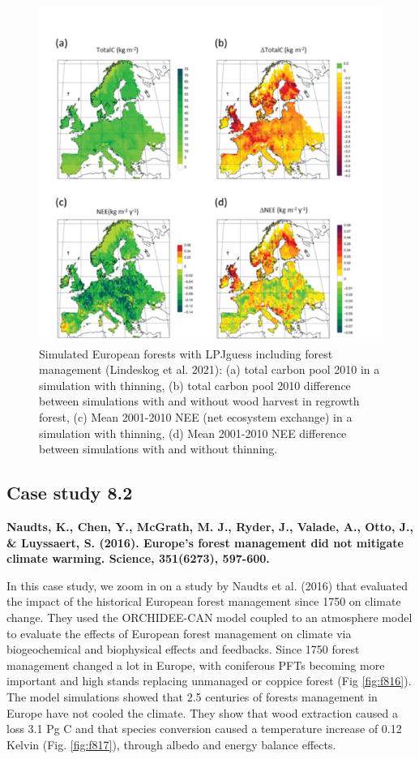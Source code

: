 \documentclass[12pt,oneside]{book}
\begin{document}
\begin{figure}

{\centering \includegraphics[width=0.8\linewidth]{figures/chap8/f815_LPJ_manag_result} 

}

\caption{Simulated European forests with LPJguess including forest management (Lindeskog et al. 2021): (a) total carbon pool 2010 in a simulation with thinning, (b) total carbon pool 2010 difference between simulations with and without wood harvest in regrowth forest, (c) Mean 2001-2010 NEE (net ecosystem exchange) in a simulation with thinning, (d) Mean 2001-2010 NEE difference between simulations with and without thinning.}\label{fig:f815}
\end{figure}

\subsection{Case study 8.2}\label{case-study-8.2}

\textbf{Naudts, K., Chen, Y., McGrath, M. J., Ryder, J., Valade, A.,
Otto, J., \& Luyssaert, S. (2016). Europe's forest management did not
mitigate climate warming. Science, 351(6273), 597-600.}

In this case study, we zoom in on a study by Naudts et al. (2016) that
evaluated the impact of the historical European forest management since
1750 on climate change. They used the ORCHIDEE-CAN model coupled to an
atmosphere model to evaluate the effects of European forest management
on climate via biogeochemical and biophysical effects and feedbacks.
Since 1750 forest management changed a lot in Europe, with coniferous
PFTs becoming more important and high stands replacing unmanaged or
coppice forest (Fig \ref{fig:f816}). The model simulations showed that
2.5 centuries of forests management in Europe have not cooled the
climate. They show that wood extraction caused a loss 3.1 Pg C and that
species conversion caused a temperature increase of 0.12 Kelvin (Fig.
\ref{fig:f817}), through albedo and energy balance effects.
\end{document}
